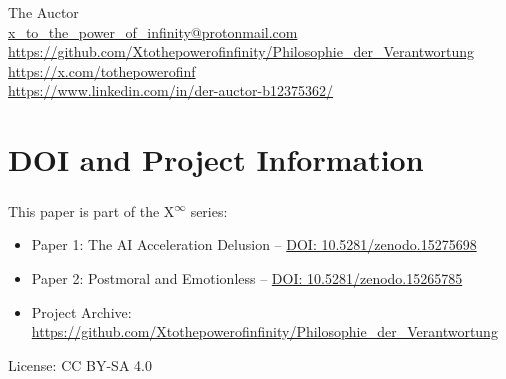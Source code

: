 \documentclass[12pt,a4paper]{article}
\begin{document}
\sloppy
The Auctor \\
\href{mailto:x_to_the_power_of_infinity@protonmail.com}{x\_to\_the\_power\_of\_infinity@protonmail.com} \\
\url{https://github.com/Xtothepowerofinfinity/Philosophie_der_Verantwortung} \\
\url{https://x.com/tothepowerofinf} \\
\url{https://www.linkedin.com/in/der-auctor-b12375362/}

\section*{DOI and Project Information}

This paper is part of the \texorpdfstring{X\textsuperscript{\(\infty\)}}{X-Infinity} series:  
\begin{itemize}
    \item Paper 1: The AI Acceleration Delusion – \href{https://doi.org/10.5281/zenodo.15275698}{DOI: 10.5281/zenodo.15275698}
    \item Paper 2: Postmoral and Emotionless – \href{https://doi.org/10.5281/zenodo.15265785}{DOI: 10.5281/zenodo.15265785}
    \item Project Archive: \url{https://github.com/Xtothepowerofinfinity/Philosophie_der_Verantwortung}
\end{itemize}

\fussy
\vfill
\noindent License: CC BY-SA 4.0
\end{document}
